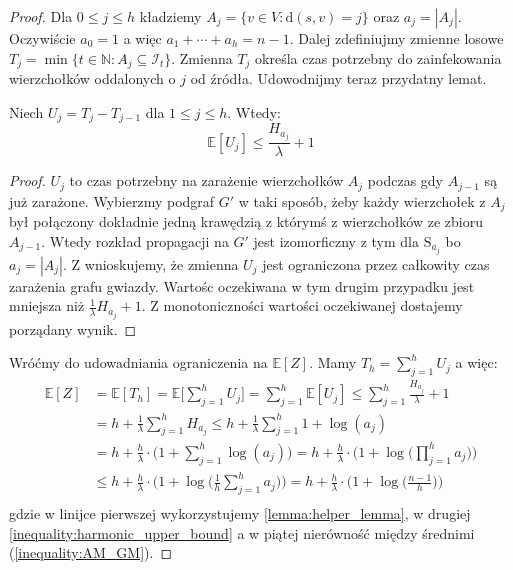 \begin{proof}
Dla $0\le j \le h$ kładziemy $A_j = \{v \in V : \mathrm{d}(s,v) = j\}$ oraz $a_j= |A_j|$. Oczywiście $a_0=1$ a więc $a_1+\cdots+ a_h = n -1 $. Dalej zdefiniujmy zmienne losowe $T_j = \min\{t\in\mathbb{N} : A_j \subseteq \mathcal{I}_t\}$. Zmienna $T_j$ określa czas potrzebny do zainfekowania wierzchołków oddalonych o $j$ od źródła. Udowodnijmy teraz przydatny lemat.

\begin{lemma}\label{lemma:helper_lemma}
Niech $U_j = T_j - T_{j-1}$ dla $1 \le j \le h$. Wtedy:
\[
    \mathbb{E}[U_j] \le \frac{H_{a_j}}{\lambda} + 1
\]
\end{lemma}
\begin{proof}
$U_j$ to czas potrzebny na zarażenie wierzchołków $A_j$ podczas gdy $A_{j-1}$ są już zarażone. Wybierzmy podgraf $G'$ w taki sposób, żeby każdy wierzchołek z $A_j$ był połączony dokładnie jedną krawędzią z którymś z wierzchołków ze zbioru $A_{j-1}$. Wtedy rozkład propagacji na $G'$ jest izomorficzny z tym dla $\mathrm{S}_{a_j}$ bo $a_j=|A_j|$. Z  wnioskujemy, że zmienna $U_j$ jest ograniczona przez całkowity czas zarażenia grafu gwiazdy. Wartośc oczekiwana w tym drugim przypadku jest mniejsza niż $\frac{1}{\lambda}H_{a_j} + 1$. Z monotoniczności wartości oczekiwanej dostajemy porządany wynik.
\end{proof}

Wróćmy do udowadniania ograniczenia na $\mathbb{E}[Z]$. Mamy $T_h = \sum_{j=1}^{h} U_j$ a więc:
\begin{equation*}
\begin{aligned}
\mathbb{E}[Z] 
&= \mathbb{E}[T_h] 
  = \mathbb{E}\Big[\sum_{j=1}^{h} U_j\Big] 
  = \sum_{j=1}^{h} \mathbb{E}[U_j] 
  \le \sum_{j=1}^{h} \frac{H_{a_j}}{\lambda} + 1 \\
&= h + \frac{1}{\lambda} \sum_{j=1}^{h} H_{a_j} 
  \le h + \frac{1}{\lambda} \sum_{j=1}^{h} 1 + \log(a_j) \\
&= h + \frac{h}{\lambda} \cdot \Big(1 + \sum_{j=1}^{h} \log(a_j) \Big) = h + \frac{h}{\lambda} \cdot \Big(1 + \log \Big(\prod_{j=1}^{h} a_j\Big)\Big)\\
&\le h + \frac{h}{\lambda} \cdot \Big(1 + \log \Big(\frac{1}{h} \sum_{j=1}^{h} a_j\Big) \Big) = h + \frac{h}{\lambda} \cdot \Big(1 + \log \Big(\frac{n-1}{h}\Big) \Big) \\
\end{aligned}
\end{equation*}
gdzie w linijce pierwszej wykorzystujemy \cref{lemma:helper_lemma}, w drugiej \cref{inequality:harmonic_upper_bound} a w piątej nierówność między średnimi (\ref{inequality:AM_GM}).
\end{proof}

